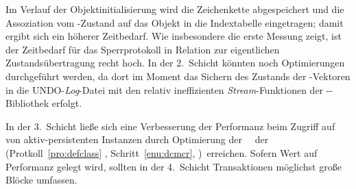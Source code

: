 %
Im Verlauf der Objektinitialisierung wird die Zeichenkette
abgespeichert und die Assoziation vom \Slt\/-Zustand auf das Objekt
in die Indextabelle eingetragen; damit ergibt sich ein h\"{o}herer
Zeitbedarf.
%
%
Wie insbesondere die erste Messung zeigt, ist der Zeitbedarf f\"{u}r das
Sperrprotokoll in Relation zur eigentlichen Zustands\"{u}bertragung recht
hoch. In der 2.~Schicht  k\"{o}nnten noch Optimierungen durchgef\"{u}hrt
werden, da dort im Moment das Sichern des Zustands der
\postore-Vektoren in die UNDO-{\em Log\/}-Datei mit den relativ
ineffizienten {\em Stream\/}-Funktionen der \std-\clogo-Bibliothek
erfolgt.
%
\par{}In der 3.~Schicht lie\ss{}e sich eine Verbesserung der Performanz
beim Zugriff auf \Slt[s]\/ von aktiv-persistenten Instanzen durch
Optimierung der \spc[n]\ \mtd[n]\ der \gfn[n]\ 
\ \ifbericht
\cite[]{bib:ki94a} \else (Protkoll~\ref{pro:defclass}
\stfn{(defclass)}, Schritt~\ref{enu:dcmcr},
\citepage{\pageref{enu:dcmcr}})\fi\ erreichen. Sofern Wert auf
Performanz gelegt wird, sollten in der 4.~Schicht Transaktionen
m\"{o}glichst gro\ss{}e Bl\"{o}cke umfassen.
